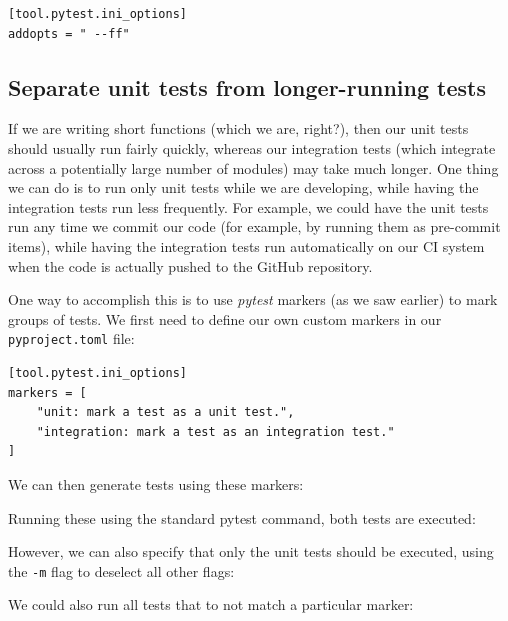 \begin{lstlisting}[style=toml]
[tool.pytest.ini_options]
addopts = " --ff"
\end{lstlisting}

\subsection{Separate unit tests from longer-running tests}

If we are writing short functions (which we are, right?), then our unit tests should usually run fairly quickly, whereas our integration tests (which integrate across a potentially large number of modules) may take much longer.
One thing we can do is to run only unit tests while we are developing, while having the integration tests run less frequently.
For example, we could have the unit tests run any time we commit our code (for example, by running them as pre-commit items), while having the integration tests run automatically on our CI system when the code is actually pushed to the GitHub repository.

One way to accomplish this is to use \textit{pytest} markers (as we saw earlier) to mark groups of tests.
We first need to define our own custom markers in our \texttt{pyproject.toml} file:

\begin{lstlisting}[style=toml]
[tool.pytest.ini_options]
markers = [
    "unit: mark a test as a unit test.",
    "integration: mark a test as an integration test."
]
\end{lstlisting}

We can then generate tests using these markers:



Running these using the standard pytest command, both tests are executed:



However, we can also specify that only the unit tests should be executed, using the \texttt{-m} flag to deselect all other flags:



We could also run all tests that to not match a particular marker:



